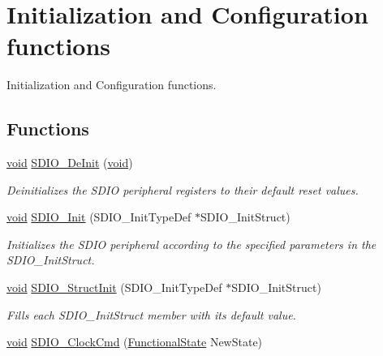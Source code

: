 \hypertarget{group___s_d_i_o___group1}{\section{Initialization and Configuration functions}
\label{group___s_d_i_o___group1}
}


Initialization and Configuration functions.  


\subsection*{Functions}
\begin{DoxyCompactItemize}
\item 
\hyperlink{group___n_a_m_e_ga18028b8badbf1ea7e704ccac3c488e82}{void} \hyperlink{group___s_d_i_o___group1_gac359d2c6c67a2590f8f9b720c0e4ff1b}{S\-D\-I\-O\-\_\-\-De\-Init} (\hyperlink{group___n_a_m_e_ga18028b8badbf1ea7e704ccac3c488e82}{void})
\begin{DoxyCompactList}\small\item\em Deinitializes the S\-D\-I\-O peripheral registers to their default reset values. \end{DoxyCompactList}\item 
\hyperlink{group___n_a_m_e_ga18028b8badbf1ea7e704ccac3c488e82}{void} \hyperlink{group___s_d_i_o___group1_gad40764a8e37c0ed5c9141ae338ff0203}{S\-D\-I\-O\-\_\-\-Init} (S\-D\-I\-O\-\_\-\-Init\-Type\-Def $\ast$S\-D\-I\-O\-\_\-\-Init\-Struct)
\begin{DoxyCompactList}\small\item\em Initializes the S\-D\-I\-O peripheral according to the specified parameters in the S\-D\-I\-O\-\_\-\-Init\-Struct. \end{DoxyCompactList}\item 
\hyperlink{group___n_a_m_e_ga18028b8badbf1ea7e704ccac3c488e82}{void} \hyperlink{group___s_d_i_o___group1_ga778d338c29df4fae9ef69432e6df32ad}{S\-D\-I\-O\-\_\-\-Struct\-Init} (S\-D\-I\-O\-\_\-\-Init\-Type\-Def $\ast$S\-D\-I\-O\-\_\-\-Init\-Struct)
\begin{DoxyCompactList}\small\item\em Fills each S\-D\-I\-O\-\_\-\-Init\-Struct member with its default value. \end{DoxyCompactList}\item 
\hyperlink{group___n_a_m_e_ga18028b8badbf1ea7e704ccac3c488e82}{void} \hyperlink{group___s_d_i_o___group1_ga7243b857d6b323748ff3a493b265bedc}{S\-D\-I\-O\-\_\-\-Clock\-Cmd} (\hyperlink{group___exported__types_gac9a7e9a35d2513ec15c3b537aaa4fba1}{Functional\-State} New\-State)

\end{DoxyCompactItemize}
